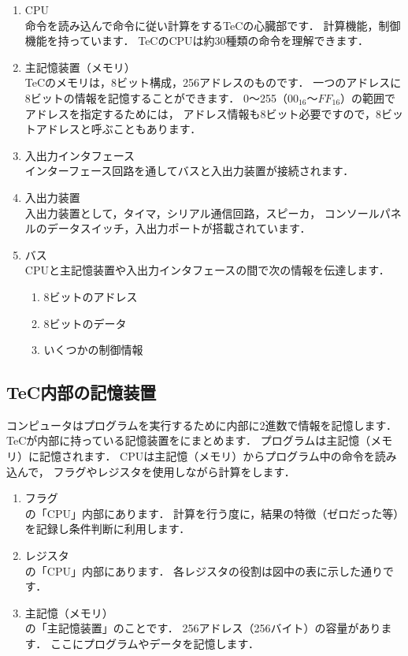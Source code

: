 \begin{enumerate}
\item CPU \\
命令を読み込んで命令に従い計算をするTeCの心臓部です．
計算機能，制御機能を持っています．
TeCのCPUは約30種類の命令を理解できます．

\item 主記憶装置（メモリ） \\
TeCのメモリは，8ビット構成，256アドレスのものです．
一つのアドレスに8ビットの情報を記憶することができます．
0〜255（$00_{16}$〜$FF_{16}$）の範囲でアドレスを指定するためには，
アドレス情報も8ビット必要ですので，8ビットアドレスと呼ぶこともあります．

\item 入出力インタフェース \\
インターフェース回路を通してバスと入出力装置が接続されます．

\item 入出力装置 \\
入出力装置として，タイマ，シリアル通信回路，スピーカ，
コンソールパネルのデータスイッチ，入出力ポートが搭載されています．

\item バス \\
CPUと主記憶装置や入出力インタフェースの間で次の情報を伝達します．

\begin{enumerate}
\item 8ビットのアドレス
\item 8ビットのデータ
\item いくつかの制御情報
\end{enumerate}
\end{enumerate}

\subsection{TeC内部の記憶装置}
コンピュータはプログラムを実行するために内部に2進数で情報を記憶します．
TeCが内部に持っている記憶装置をにまとめます．
プログラムは主記憶（メモリ）に記憶されます．
CPUは主記憶（メモリ）からプログラム中の命令を読み込んで，
フラグやレジスタを使用しながら計算をします．


\begin{enumerate}
\item フラグ \\
の「CPU」内部にあります．
計算を行う度に，結果の特徴（ゼロだった等）を記録し条件判断に利用します．

\item レジスタ \\
の「CPU」内部にあります．
各レジスタの役割は図中の表に示した通りです．

\item 主記憶（メモリ） \\
の「主記憶装置」のことです．
256アドレス（256バイト）の容量があります．
ここにプログラムやデータを記憶します．
\end{enumerate}

